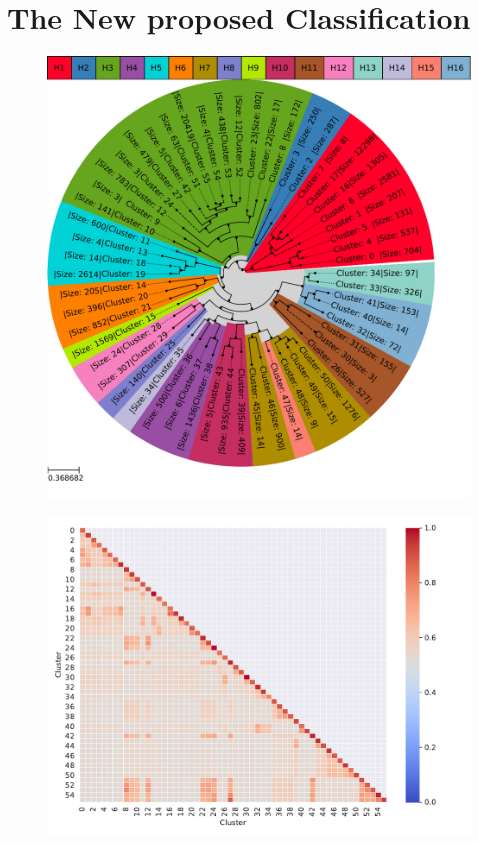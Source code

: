 \section{The New proposed Classification} \label{sec:Serotype_Classification}

\blindtext


\begin{figure}[!hbt]
    \centering
    \includegraphics[width=\textwidth]{Results/Clustertree_Segment_4.pdf}
    \caption[]{}
\end{figure}

\begin{figure}[!hbt]
    \centering
    \includegraphics[width=\textwidth]{Results/Cluster_Difference_Segment_4.pdf}
    \caption[]{}
\end{figure}

